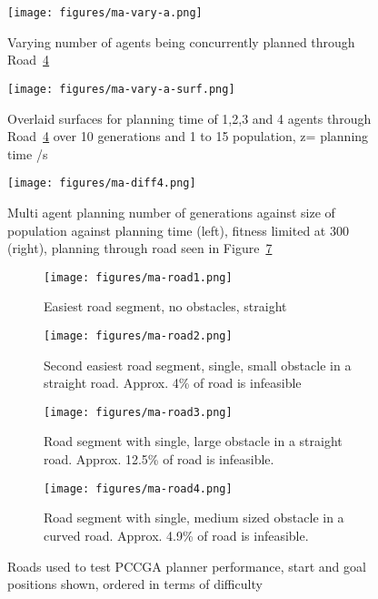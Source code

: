 \begin{figure}[ht]
  \centering
  \texttt{[image: figures/ma-vary-a.png]}
  \caption{\label{fig:ma-vary-a} Varying number of agents being concurrently planned through Road~\ref{subfig:ma-road1}}
\end{figure}

\begin{figure}[ht]
  \centering
  \texttt{[image: figures/ma-vary-a-surf.png]}
  \caption{\label{fig:ma-vary-a-surf} Overlaid surfaces for planning time of 1,2,3 and 4 agents through Road~\ref{subfig:ma-road1} over 10 generations and 1 to 15 population, z= planning time /s}
\end{figure}

\begin{figure}[ht]
  \centering
  \texttt{[image: figures/ma-diff4.png]}
  \caption{\label{fig:ma-diff4} Multi agent planning number of generations against size of population against planning time (left), fitness limited at 300 (right), planning through road seen in Figure~\ref{subfig:ma-road4}}
\end{figure}



\begin{figure}
  \centering
  \begin{subfigure}[b]{0.44\textwidth}
    \centering
    \texttt{[image: figures/ma-road1.png]}
    \caption{\label{subfig:ma-road1}Easiest road segment, no obstacles, straight}
  \end{subfigure}
  \begin{subfigure}[b]{0.44\textwidth}
    \centering
    \texttt{[image: figures/ma-road2.png]}
    \caption{\label{subfig:ma-road2}Second easiest road segment, single, small obstacle in a straight road. Approx. 4\% of road is infeasible}
  \end{subfigure}
  \begin{subfigure}[b]{0.44\textwidth}
    \centering
    \texttt{[image: figures/ma-road3.png]}
    \caption{\label{subfig:ma-road3}Road segment with single, large obstacle in a straight road. Approx. 12.5\% of road is infeasible.}
  \end{subfigure}
  \begin{subfigure}[b]{0.44\textwidth}
    \centering
    \texttt{[image: figures/ma-road4.png]}
    \caption{\label{subfig:ma-road4}Road segment with single, medium sized obstacle in a curved road. Approx. 4.9\% of road is infeasible.}
  \end{subfigure}
  \caption{\label{fig:multi-agent-roads} Roads used to test PCCGA planner performance, start and goal positions shown, ordered in terms of difficulty}
\end{figure}

